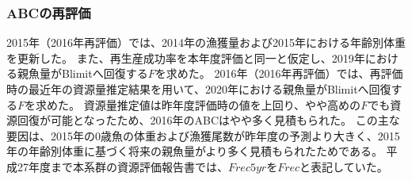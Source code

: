 \subsubsection{ABCの再評価}
2015年（2016年再評価）では、2014年の漁獲量および2015年における年齢別体重を更新した。
また、再生産成功率を本年度評価と同一と仮定し、2019年における親魚量がBlimitへ回復する$F$を求めた。
2016年（2016年再評価）では、再評価時の最近年の資源量推定結果を用いて、2020年における親魚量がBlimitへ回復する$F$を求めた。
資源量推定値は昨年度評価時の値を上回り、やや高めの$F$でも資源回復が可能となったため、2016年のABCはやや多く見積もられた。
この主な要因は、2015年の0歳魚の体重および漁獲尾数が昨年度の予測より大きく、2015年の年齢別体重に基づく将来の親魚量がより多く見積もられたためである。
平成27年度まで本系群の資源評価報告書では、$Frec5yr$を$Frec$と表記していた。
